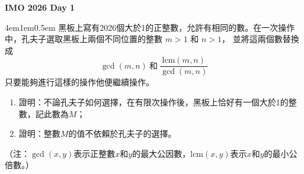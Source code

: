 \documentclass[12pt]{article}
\begin{document}
\thispagestyle{fancy}  %
\begin{center}
    \textbf{\Large{IMO 2026 Day 1}}
\end{center}

\begin{mybox}[第一題]{4em}{1em}{0.5em}
    黑板上寫有2026個大於1的正整數，允許有相同的數。在一次操作中，孔夫子選取黑板上兩個不同位置的整數 $m>1$ 和 $n>1$，
    並將這兩個數替換成
    $$  
        \gcd\left(m,n\right)\ \text{和}\ \frac{\text{lcm}\left(m,n\right)}{\gcd\left(m,n\right)}
    $$
    只要能夠進行這樣的操作他便繼續操作。
    \begin{enumerate}[label=(\arabic*)]
        \item 證明：不論孔夫子如何選擇，在有限次操作後，黑板上恰好有一個大於1的整數，記此數為$M$；
        \item 證明：整數$M$的值不依賴於孔夫子的選擇。
    \end{enumerate}
    （注：$\gcd\left(x,y\right)$表示正整數$x$和$y$的最大公因數，$\text{lcm}\left(x,y\right)$表示$x$和$y$的最小公倍數。）
\end{mybox}
\end{document}

